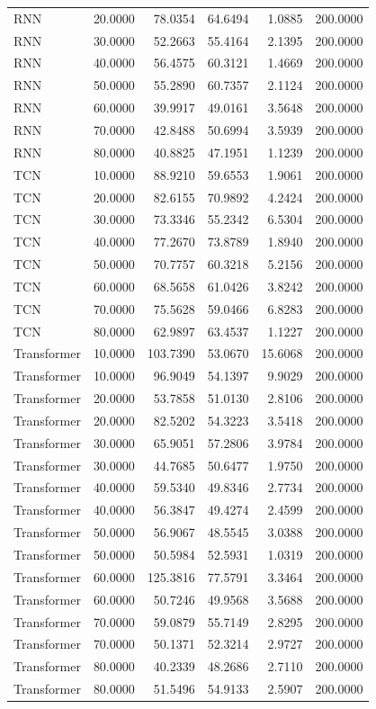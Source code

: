 \begin{tabular}{lrrrrr}
RNN & 20.0000 & 78.0354 & 64.6494 & 1.0885 & 200.0000 \\
RNN & 30.0000 & 52.2663 & 55.4164 & 2.1395 & 200.0000 \\
RNN & 40.0000 & 56.4575 & 60.3121 & 1.4669 & 200.0000 \\
RNN & 50.0000 & 55.2890 & 60.7357 & 2.1124 & 200.0000 \\
RNN & 60.0000 & 39.9917 & 49.0161 & 3.5648 & 200.0000 \\
RNN & 70.0000 & 42.8488 & 50.6994 & 3.5939 & 200.0000 \\
RNN & 80.0000 & 40.8825 & 47.1951 & 1.1239 & 200.0000 \\
TCN & 10.0000 & 88.9210 & 59.6553 & 1.9061 & 200.0000 \\
TCN & 20.0000 & 82.6155 & 70.9892 & 4.2424 & 200.0000 \\
TCN & 30.0000 & 73.3346 & 55.2342 & 6.5304 & 200.0000 \\
TCN & 40.0000 & 77.2670 & 73.8789 & 1.8940 & 200.0000 \\
TCN & 50.0000 & 70.7757 & 60.3218 & 5.2156 & 200.0000 \\
TCN & 60.0000 & 68.5658 & 61.0426 & 3.8242 & 200.0000 \\
TCN & 70.0000 & 75.5628 & 59.0466 & 6.8283 & 200.0000 \\
TCN & 80.0000 & 62.9897 & 63.4537 & 1.1227 & 200.0000 \\
Transformer & 10.0000 & 103.7390 & 53.0670 & 15.6068 & 200.0000 \\
Transformer & 10.0000 & 96.9049 & 54.1397 & 9.9029 & 200.0000 \\
Transformer & 20.0000 & 53.7858 & 51.0130 & 2.8106 & 200.0000 \\
Transformer & 20.0000 & 82.5202 & 54.3223 & 3.5418 & 200.0000 \\
Transformer & 30.0000 & 65.9051 & 57.2806 & 3.9784 & 200.0000 \\
Transformer & 30.0000 & 44.7685 & 50.6477 & 1.9750 & 200.0000 \\
Transformer & 40.0000 & 59.5340 & 49.8346 & 2.7734 & 200.0000 \\
Transformer & 40.0000 & 56.3847 & 49.4274 & 2.4599 & 200.0000 \\
Transformer & 50.0000 & 56.9067 & 48.5545 & 3.0388 & 200.0000 \\
Transformer & 50.0000 & 50.5984 & 52.5931 & 1.0319 & 200.0000 \\
Transformer & 60.0000 & 125.3816 & 77.5791 & 3.3464 & 200.0000 \\
Transformer & 60.0000 & 50.7246 & 49.9568 & 3.5688 & 200.0000 \\
Transformer & 70.0000 & 59.0879 & 55.7149 & 2.8295 & 200.0000 \\
Transformer & 70.0000 & 50.1371 & 52.3214 & 2.9727 & 200.0000 \\
Transformer & 80.0000 & 40.2339 & 48.2686 & 2.7110 & 200.0000 \\
Transformer & 80.0000 & 51.5496 & 54.9133 & 2.5907 & 200.0000 \\
\bottomrule
\end{tabular}
